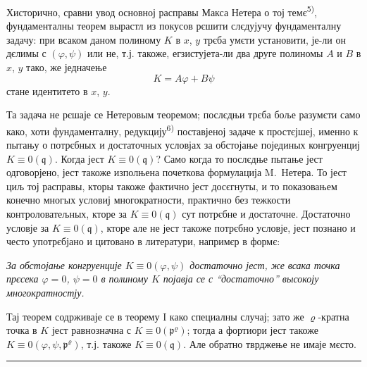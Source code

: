 \documentclass[11pt]{article}
\theoremstyle{plain}
\begin{document}
Хисторично, сравни увод основној расправы Макса Нетера о тој
темє\textsuperscript{5)}, фундаменталны теорем вырастл из покусов
рєшити слєдујучу фундаменталну задачу: при всаком даном полиному
$K$ в $x$, $y$ трєба умєти установити, је-ли он дєлимы с
$(\varphi, \psi)$ или не, т.ј. такоже, егзистујета-ли два друге
полиномы $A$ и $B$ в $x$, $y$ тако, же једначење
\[
K = A\varphi + B\psi
\]
стане идентитето в $x$, $y$.

Та задача не рєшаје се Нетеровым теоремом; послєдњи трєба боље
разумєти само како, хоти фундаменталну, редукцију\textsuperscript{6)}
поставјеној задаче к простєјшеј, именно к пытању о потрєбных и
достаточных условјах за обстојање појединых конгруенциј
$K \equiv 0(\mathfrak{q})$. Когда јест $K \equiv 0(\mathfrak{q})$?
Само когда то послєдње пытање јест одговорјено, јест такоже
изполњена почеткова формулација M.\ Нетера. То јест циљ тој
расправы, кторы такоже фактично јест досєгнуты, и то показовањем
конечно многых условиј многократности, практично без тежкости
контроловатељных, кторе за $K \equiv 0(\mathfrak{q})$ сут
потрєбне и достаточне. Достаточно условје за
$K \equiv 0(\mathfrak{q})$, кторе але не јест такоже потрєбно
условје, јест познано и често употрєбјано и цитовано в литератури,
напримєр в формє:

\smallskip
\textit{За обстојање конгруенције $K \equiv 0(\varphi, \psi)$
достаточно јест, же всака точка прєсека $\varphi = 0$, $\psi = 0$
в полиному $K$ појавја се с ``достаточно'' высокоју многократностју.}

\smallskip
Тај теорем содрживаје се в теорему I како специалны случај; зато же
$\varrho$-кратна точка в $K$ јест равнозначна с
$K \equiv 0(\mathfrak{p}^{\varrho})$; тогда а фортиори јест такоже
$K \equiv 0(\varphi, \psi, \mathfrak{p}^{\varrho})$, т.ј. такоже
$K \equiv 0(\mathfrak{q})$. Але обратно тврджење не имаје мєсто.

\vspace{0.5em}
\noindent\rule{\textwidth}{0.4pt}
\vspace{0.3em}
\end{document}
